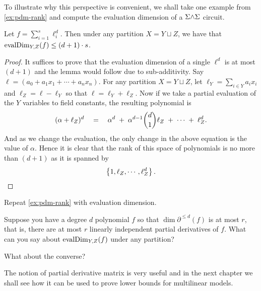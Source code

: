 To illustrate why this perspective is convenient, we shall take one example from \autoref{ex:pdm-rank} and compute the evaluation dimension of a $\Sigma\mathord{\wedge}\Sigma$ circuit. 

\begin{claim}
Let $f = \sum_{i=1}^s \ell_i^d$. Then under any partition $X = Y \sqcup Z$, we have that $\operatorname{evalDim}_{Y,Z}(f) \leq (d+1) \cdot s$. 
\end{claim}
\begin{proof}
  It suffices to prove that the evaluation dimension of a single $\ell^d$ is at most $(d+1)$ and the lemma would follow due to sub-additivity.
Say $\ell = (a_0 + a_1 x_1 + \cdots + a_nx_n)$.
For any partition $X = Y \sqcup Z$, let $\ell_Y = \sum_{i\in Y} a_i x_i$ and $\ell_Z = \ell - \ell_Y$ so that $\ell = \ell_Y + \ell_Z$. Now if we take a partial evaluation of the $Y$ variables to field constants, the resulting polynomial is 
\[
(\alpha + \ell_Z)^d \quad = \quad \alpha^d \;+\; \alpha^{d-1} \binom{d}{1} \ell_Z \;+\; \cdots \;+\; \ell_Z^d. 
\]
And as we change the evaluation, the only change in the above equation is the value of $\alpha$. Hence it is clear that the rank of this space of polynomials is no more than $(d+1)$ as it is spanned by 
\[
\left\{1, \ell_Z, \cdots, \ell_Z^d\right\}.\qedhere
\]
\end{proof}

\begin{exercise}
Repeat \autoref{ex:pdm-rank} with evaluation dimension. 
\end{exercise}

\begin{exercise}
Suppose you have a degree $d$ polynomial $f$ so that $\dim{\partial^{\leq d}(f)}$ is at most $r$, that is, there are at most $r$ linearly independent partial derivatives of $f$. What can you say about $\operatorname{evalDim}_{Y,Z}(f)$ under any partition? 

What about the converse?
\end{exercise}

\bigskip 

The notion of partial derivative matrix is very useful and in the next chapter we shall see how it can be used to prove lower bounds for multilinear models.


